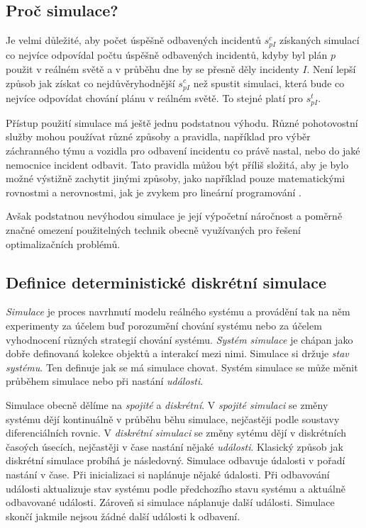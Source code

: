 \subsection{Proč simulace?}\label{kap:procSimulace}

Je velmi důležité, aby počet úspěšně odbavených incidentů $s^c_{pI}$ získaných simulací co nejvíce odpovídal počtu úspěšně odbavených incidentů,
kdyby byl plán $p$ použit v reálném světě a v průběhu dne by se přesně děly incidenty $I$.
Není lepší způsob jak získat co nejdůvěryhodnější $s^c_{pI}$ než spustit simulaci, která bude co nejvíce odpovídat chování plánu v reálném světě.
To stejné platí pro $s^t_{pI}$.

Přístup použití simulace má ještě jednu podstatnou výhodu.
Různé pohotovostní služby mohou používat různé způsoby a pravidla, například pro výběr záchranného týmu a vozidla pro odbavení incidentu co právě nastal, nebo do jaké nemocnice incident odbavit.
Tato pravidla můžou být příliš složitá, aby je bylo možné výstižně zachytit jinými způsoby, jako například pouze matematickými rovnostmi a nerovnostmi, jak je zvykem pro lineární programování \cite{LP}.

Avšak podstatnou nevýhodou simulace je její výpočetní náročnost a poměrně značné omezení použitelných technik obecně využívaných pro řešení optimalizačních problémů.

\subsection{Definice deterministické diskrétní simulace}

\textit{Simulace} je proces navrhnutí modelu reálného systému a provádění tak na něm experimenty za účelem buď porozumění chování systému
nebo za účelem vyhodnocení různých strategií chování systému.
\textit{Systém simulace} je chápan jako dobře definovaná kolekce objektů a interakcí mezi nimi.
Simulace si držuje \textit{stav systému}. Ten definuje jak se má simulace chovat.
Systém simulace se může měnit průběhem simulace nebo při nastání \textit{události}.

Simulace obecně dělíme na \textit{spojité} a \textit{diskrétní}.
V \textit{spojité simulaci} se změny systému dějí kontinuálně v průběhu běhu simulace, nejčastěji podle soustavy diferenciálních rovnic.
V \textit{diskrétní simulaci} se změny sytému dějí v diskrétních časoých úsecích, nejčastěji v čase nastání nějaké \textit{události}.
Klasický způsob jak diskrétní simulace probíhá je následovný.
Simulace odbavuje údalosti v pořadí nastání v čase.
Při inicializaci si naplánuje nějaké údalosti.
Při odbavování události aktualizuje stav systému podle předchozího stavu systému a aktuálně odbavované události. Zároveň si simulace náplanuje další události. 
Simulace skončí jakmile nejsou žádné další události k odbavení.

